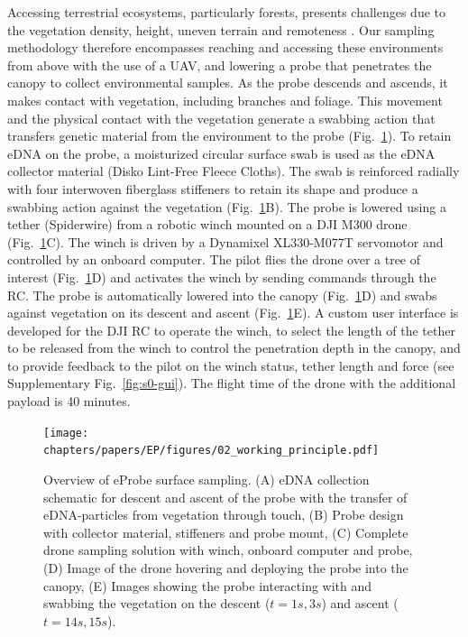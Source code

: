Accessing terrestrial ecosystems, particularly forests, presents challenges due to the vegetation density, height, uneven terrain and remoteness \cite{Nakamura2017, lowman-2012}. Our sampling methodology therefore encompasses reaching and accessing these environments from above with the use of a UAV, and lowering a probe that penetrates the canopy to collect environmental samples. As the probe descends and ascends, it makes contact with vegetation, including branches and foliage. This movement and the physical contact with the vegetation generate a swabbing action that transfers genetic material from the environment to the probe (Fig.~\ref{fig:2-working-principle}). To retain \gls{eDNA} on the probe, a moisturized circular surface swab is used as the \gls{eDNA} collector material (Disko Lint-Free Fleece Cloths). The swab is reinforced radially with four interwoven fiberglass stiffeners to retain its shape and produce a swabbing action against the vegetation (Fig.~\ref{fig:2-working-principle}B). The probe is lowered using a tether (Spiderwire) from a robotic winch mounted on a DJI M300 drone (Fig.~\ref{fig:2-working-principle}C). The winch is driven by a Dynamixel XL330-M077T servomotor and controlled by an onboard computer. The pilot flies the drone over a tree of interest (Fig.~\ref{fig:2-working-principle}D) and activates the winch by sending commands through the \gls{RC}. The probe is automatically lowered into the canopy (Fig.~\ref{fig:2-working-principle}D) and swabs against vegetation on its descent and ascent (Fig.~\ref{fig:2-working-principle}E). A custom user interface is developed for the DJI RC to operate the winch, to select the length of the tether to be released from the winch to control the penetration depth in the canopy, and to provide feedback to the pilot on the winch status, tether length and force (see Supplementary Fig.~\ref{fig:s0-gui}). The flight time of the drone with the additional payload is 40 minutes.

\begin{figure}[tb]
    \centering
    \texttt{[image: chapters/papers/EP/figures/02\_working\_principle.pdf]}
    \caption{Overview of eProbe surface sampling. (A) \gls{eDNA} collection schematic for descent and ascent of the probe with the transfer of \gls{eDNA}-particles from vegetation through touch, (B) Probe design with collector material, stiffeners and probe mount, (C) Complete drone sampling solution with winch, onboard computer and probe, (D) Image of the drone hovering and deploying the probe into the canopy, (E) Images showing the probe interacting with and swabbing the vegetation on the descent ($t=1s,3s$) and ascent ($t=14s,15s$).}
    \label{fig:2-working-principle}
\end{figure}

